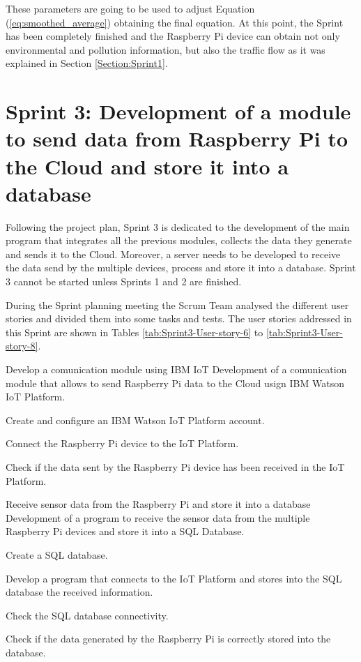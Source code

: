 These parameters are going to be used to adjust Equation (\ref{eq:smoothed_average}) obtaining the final equation. At this point, the Sprint has been completely finished and the Raspberry Pi device can obtain not only environmental and pollution information, but also the traffic flow as it was explained in Section \ref{Section:Sprint1}.


\section{Sprint 3: Development of a module to send data from Raspberry Pi to the Cloud and store it into a database}
Following the project plan, Sprint 3 is dedicated to the development of the main program that integrates all the previous modules, collects the data they generate and sends it to the Cloud. Moreover, a server needs to be developed to receive the data send by the multiple devices, process and store it into a database. Sprint 3 cannot be started unless Sprints 1 and 2 are finished.

During the Sprint planning meeting the Scrum Team analysed the different user stories and divided them into some tasks and tests. The user stories addressed in this Sprint are shown in Tables \ref{tab:Sprint3-User-story-6} to \ref{tab:Sprint3-User-story-8}.


{Develop a comunication module using IBM IoT}
{Development of a comunication module that allows to send Raspberry Pi data to the Cloud usign IBM Watson IoT Platform.}
{	\item Create and configure an IBM Watson IoT Platform account.
	\item Connect the Raspberry Pi device to the IoT Platform.
}{	\item Check if the data sent by the Raspberry Pi device has been received in the IoT Platform.
}

{Receive sensor data from the Raspberry Pi and store it into a database}
{Development of a program to receive the sensor data from the multiple Raspberry Pi devices and store it into a SQL Database.}
{	\item Create a SQL database.
	\item Develop a program that connects to the IoT Platform and stores into the SQL database the received information.
}{	\item Check the SQL database connectivity.
	\item Check if the data generated by the Raspberry Pi is correctly stored into the database.
}

